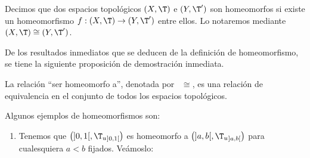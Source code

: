 \begin{definicion}
    Decimos que dos espacios topológicos $(X,\T)$ e $(Y, \T')$ son homeomorfos si existe un homeomorfismo $f:(X,\T)\to (Y,\T')$ entre ellos. Lo notaremos mediante $(X,\T) \cong (Y, \T')$.
\end{definicion}
De los resultados inmediatos que se deducen de la definición de homeomorfismo, se tiene la siguiente proposición de demostración inmediata.
\begin{prop}
    La relación ``ser homeomorfo a'', denotada por ~$\cong$, es una relación de equivalencia en el conjunto de todos los espacios topológicos.
\end{prop}

\begin{ejemplo}
    Algunos ejemplos de homeomorfismos son:
    \begin{enumerate}
        \item Tenemos que $\left(]0,1[,{\T_u}_{]0,1[}\right)$ es homeomorfo a $\left(]a,b[,{\T_u}_{]a,b[}\right)$ para cualesquiera $a<b$ fijados. Veámoslo:
        \begin{figure}[H]
            \centering
\end{figure}
\end{enumerate}
\end{ejemplo}
